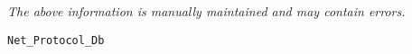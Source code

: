 \label{pkg:net\_protocol\_db}

{\tiny \it The above information is manually maintained and may contain errors.}
\begin{verbatim}
Net_Protocol_Db
\end{verbatim}
